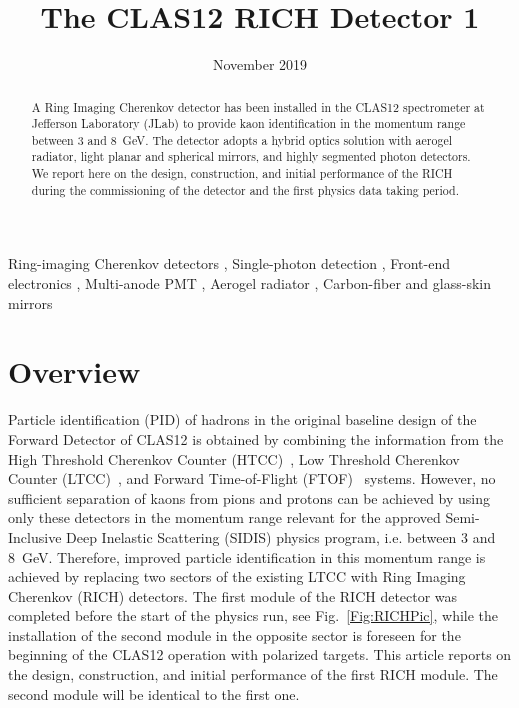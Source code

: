 \documentclass[5p,times,twocolumn]{elsarticle}
\title{The CLAS12 RICH Detector 1}
\author{ }
\date{November 2019}
\begin{document}

\begin{abstract}
  A Ring Imaging Cherenkov detector has been installed in the CLAS12 spectrometer at Jefferson Laboratory (JLab)
  to provide kaon identification in the momentum range between 3 and 8~GeV. The detector adopts a hybrid optics
  solution with aerogel radiator, light planar and spherical mirrors, and highly segmented photon detectors. We report
  here on the design, construction, and initial performance of the RICH during the commissioning of the detector and
  the first physics data taking period. 
\end{abstract}

\begin{keyword}
Ring-imaging Cherenkov detectors
\sep
Single-photon detection
\sep
Front-end electronics
\sep
Multi-anode PMT
\sep
Aerogel radiator
\sep
Carbon-fiber and glass-skin mirrors
\end{keyword}

\maketitle


\section{Overview}

Particle identification (PID) of hadrons in the original baseline design of the Forward Detector of CLAS12 is obtained
by combining the information from the High Threshold Cherenkov Counter (HTCC)~\cite{htcc-nim}, Low Threshold
Cherenkov Counter (LTCC)~\cite{ltcc-nim}, and Forward Time-of-Flight (FTOF)~\cite{ftof-nim} systems. However,
no sufficient separation of kaons from pions and protons can be achieved by using only these detectors in the
momentum range relevant for the approved Semi-Inclusive Deep Inelastic Scattering (SIDIS) physics program,
i.e. between 3 and 8~GeV. Therefore, improved particle identification in this momentum range is achieved by
replacing two sectors of the existing LTCC with Ring Imaging Cherenkov (RICH) detectors. The first module of the
RICH detector was completed before the start of the physics run, see Fig.~\ref{Fig:RICHPic}, while the installation
of the second module in the opposite sector is foreseen for the beginning of the CLAS12 operation with polarized
targets. This article reports on the design, construction, and initial performance of the first RICH module. The second
module will be identical to the first one.
\end{document}
